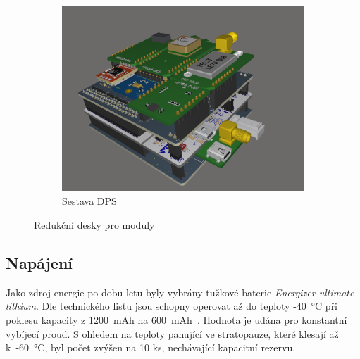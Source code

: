 \documentclass[twoside]{ctuthesis}
\theoremstyle{plain}
\theoremstyle{definition}
\theoremstyle{note}
\begin{document}
\begin{figure}[hbtp]
\begin{subfigure}{.3\textwidth}
				\includegraphics[height=0.7\linewidth]{Figures/shield_assembly.png}
				\caption{Sestava DPS}
				\label{fig:shield:assembly}
			\end{subfigure}
			\caption{Redukční desky pro moduly}
			\label{fig:shields:DPS}
		\end{figure}



		
		\subsection{Napájení}
		Jako zdroj energie po dobu letu byly vybrány tužkové baterie \textit{Energizer ultimate lithium}. Dle technického listu jsou schopny operovat až do teploty -40~°C při poklesu kapacity z 1200~mAh na 600~mAh~\cite{dsh_AA}. Hodnota je udána pro konstantní vybíjecí proud. S ohledem na teploty panující ve stratopauze, které klesají až k~-60~°C, byl počet zvýšen na 10 ks, nechávající kapacitní rezervu. 
\end{document}
